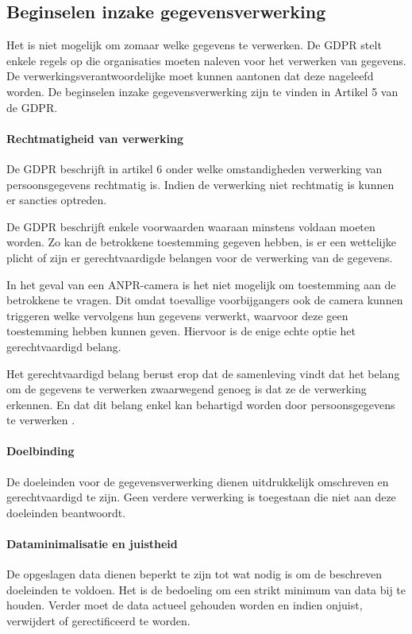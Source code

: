 \subsection{Beginselen inzake gegevensverwerking}
Het is niet mogelijk om zomaar welke gegevens te verwerken. De GDPR stelt enkele regels op die organisaties moeten naleven voor het verwerken van gegevens. De verwerkingsverantwoordelijke moet kunnen aantonen dat deze nageleefd worden. De beginselen inzake gegevensverwerking zijn te vinden in Artikel 5 van de GDPR.

\paragraph{Rechtmatigheid van verwerking}
De GDPR beschrijft in artikel 6 onder welke omstandigheden verwerking van persoonsgegevens rechtmatig is. Indien de verwerking niet rechtmatig is kunnen er sancties optreden.

De GDPR beschrijft enkele voorwaarden waaraan minstens voldaan moeten worden. Zo kan de betrokkene toestemming gegeven hebben, is er een wettelijke plicht of zijn er gerechtvaardigde belangen voor de verwerking van de gegevens.

In het geval van een ANPR-camera is het niet mogelijk om toestemming aan de betrokkene te vragen. Dit omdat toevallige voorbijgangers ook de camera kunnen triggeren welke vervolgens hun gegevens verwerkt, waarvoor deze geen toestemming hebben kunnen geven. Hiervoor is de enige echte optie het gerechtvaardigd belang.

Het gerechtvaardigd belang berust erop dat de samenleving vindt dat het belang om de gegevens te verwerken zwaarwegend genoeg is dat ze de verwerking erkennen. En dat dit belang enkel kan behartigd worden door persoonsgegevens te verwerken \autocite{autoriteit2019gerechtvaardigd}.

\paragraph{Doelbinding}
De doeleinden voor de gegevensverwerking dienen uitdrukkelijk omschreven en gerechtvaardigd te zijn. Geen verdere verwerking is toegestaan die niet aan deze doeleinden beantwoordt.

\paragraph{Dataminimalisatie en juistheid}
De opgeslagen data dienen beperkt te zijn tot wat nodig is om de beschreven doeleinden te voldoen. Het is de bedoeling om een strikt minimum van data bij te houden. Verder moet de data actueel gehouden worden en indien onjuist, verwijdert of gerectificeerd te worden.

